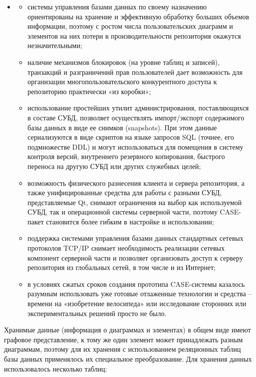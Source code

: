 \documentclass[a4paper]{article}
\newcommand\liststyleWWviiiNumx{%
\renewcommand\labelitemi{[F0B7?]}
\renewcommand\labelitemii{o}
\renewcommand\labelitemiii{[F0B7?]}
\renewcommand\labelitemiv{[F0B7?]}
}
\begin{document}
\liststyleWWviiiNumx
\begin{itemize}
\item \begin{itemize}
\item {
системы управления базами данных по своему назначению ориентированы на
хранение и эффективную обработку больших объемов информации, поэтому с
ростом числа пользовательских диаграмм и элементов на них потери в
производительности репозитория окажутся незначительными;}
\item {
наличие механизмов блокировок (на уровне таблиц и записей), транзакций и
разграничений прав пользователей дает возможность для организации
многопользовательского конкурентного доступа к репозиторию практически
«из коробки»;}
\item {
использование простейших утилит администрирования, поставляющихся в
составе СУБД, позволяет осуществлять импорт/экспорт содержимого базы
данных в виде ее снимков (\foreignlanguage{english}{snapshots}). При
этом данные сериализуются в виде скриптов на языке запросов
\foreignlanguage{english}{SQL} (точнее, его подмножестве
\foreignlanguage{english}{DDL}) и могут использоваться для помещения в
систему контроля версий, внутреннего резервного копирования, быстрого
переноса на другую СУБД или других служебных целей;}
\item {
возможность физического разнесения клиента и сервера репозитория, а
также унифицированные средства для работы с разными СУБД,
представляемые
\foreignlanguage{english}{Qt}\foreignlanguage{english}{,} снимают
ограничения на выбор как используемой СУБД, так и операционной системы
серверной части, поэтому \foreignlanguage{english}{CASE}{}-пакет
становится более гибким в настройке и использовании;}
\item {
поддержка системами управления базами данных стандартных сетевых
протоколов \foreignlanguage{english}{TCP}/\foreignlanguage{english}{IP}
снимает необходимость реализации сетевых компонент серверной части и
позволяет организовать доступ к серверу репозитория из глобальных
сетей, в том числе и из Интернет;}
\item {
в условиях сжатых сроков создания прототипа
\foreignlanguage{english}{CASE}{}-системы казалось разумным
использовать уже готовые отлаженные технологии и средства – времени на
«изобретение велосипеда» или исследование сторонних или
экспериментальных решений просто не было. }
\end{itemize}
\end{itemize}
{
Хранимые данные (информация о диаграммах и элементах) в общем виде имеют
графовое представление, к тому же один элемент может принадлежать
разным диаграммам, поэтому для их хранения с использованием реляционных
таблиц базы данных применялось их специальное преобразование. Для
хранения данных использовалось несколько таблиц:}
\end{document}
